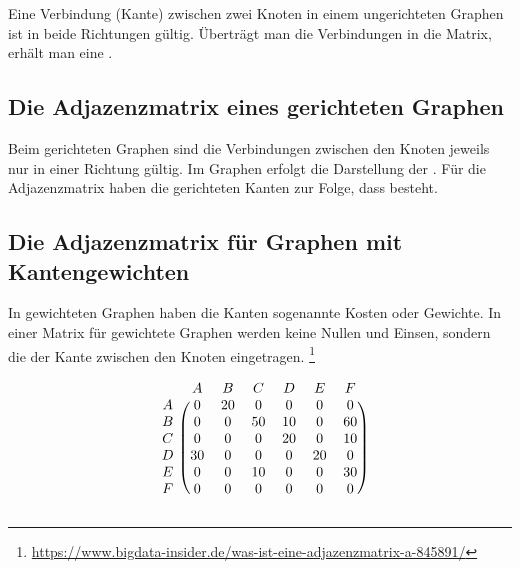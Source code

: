 \documentclass{lehramt-informatik-haupt}
\begin{document}
Eine Verbindung (Kante) zwischen zwei Knoten in einem ungerichteten
Graphen ist in beide Richtungen gültig. Überträgt man die Verbindungen
in die Matrix, erhält man eine .

%

\subsection{Die Adjazenzmatrix eines gerichteten Graphen}

Beim gerichteten Graphen sind die Verbindungen zwischen den Knoten
jeweils nur in einer Richtung gültig. Im Graphen erfolgt die Darstellung
der . Für die Adjazenzmatrix haben die
gerichteten Kanten zur Folge, dass  besteht.

%

\subsection{Die Adjazenzmatrix für Graphen mit Kantengewichten}

In gewichteten Graphen haben die Kanten sogenannte Kosten oder Gewichte.
In einer Matrix für gewichtete Graphen werden keine Nullen und Einsen,
sondern die  der Kante zwischen
den Knoten eingetragen.
\footnote{\url{https://www.bigdata-insider.de/was-ist-eine-adjazenzmatrix-a-845891/}}

\[
\begin{blockarray}{ccccccc}
& A & B & C & D & E & F \\
\begin{block}{c(cccccc)}
A & 0  & 20 & 0  & 0  & 0  & 0  \\
B & 0  & 0  & 50 & 10 & 0  & 60 \\
C & 0  & 0  & 0  & 20 & 0  & 10 \\
D & 30 & 0  & 0  & 0  & 20 & 0  \\
E & 0  & 0  & 10 & 0  & 0  & 30 \\
F & 0  & 0  & 0  & 0  & 0  & 0  \\
\end{block}
\end{blockarray}
\]

\usetikzlibrary{matrix,arrows,fit}

\end{document}
